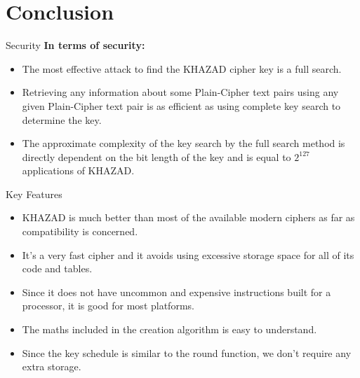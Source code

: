 \section{Conclusion}

\begin{frame}{Security}
    \textbf{In terms of security:}
    \begin{itemize}
        \item The most effective attack to find the KHAZAD cipher key is a full search.
        \item Retrieving any information about some Plain-Cipher text pairs using any given Plain-Cipher text pair is as efficient as using complete key search to determine the key.
        \item The approximate complexity of the key search by the full search method is directly dependent on the bit length of the key and is equal to $2^{127}$ applications of KHAZAD.
    \end{itemize}
\end{frame}

\begin{frame}{Key Features}
    \begin{itemize}
        \item KHAZAD is much better than most of the available modern ciphers as far as compatibility is concerned.
        \item It's a very fast cipher and it avoids using excessive storage space for all of its code and tables.
        \item Since it does not have uncommon and expensive instructions built for a processor, it is good for most platforms.
        \item The maths included in the creation algorithm is easy to understand.
        \item Since the key schedule is similar to the round function, we don’t require any extra storage.
    \end{itemize}
\end{frame}
